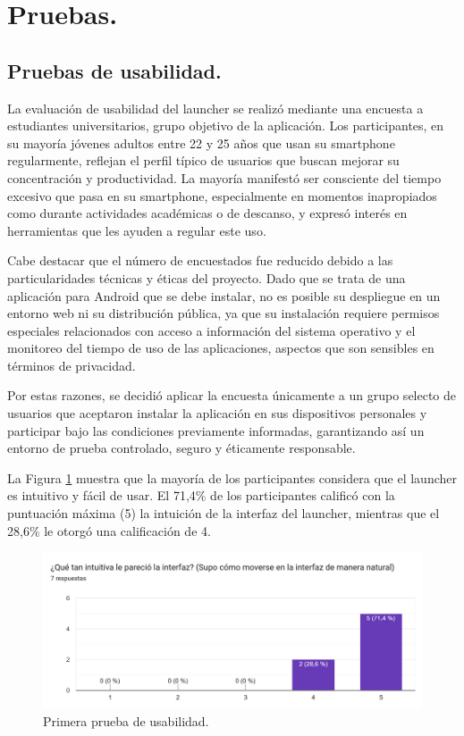 \section{Pruebas.}
\subsection{Pruebas de usabilidad.}

La evaluación de usabilidad del launcher se realizó mediante una encuesta a estudiantes universitarios, grupo objetivo de la aplicación. Los participantes, en su mayoría jóvenes adultos entre 22 y 25 años que usan su smartphone regularmente, reflejan el perfil típico de usuarios que buscan mejorar su concentración y productividad. La mayoría manifestó ser consciente del tiempo excesivo que pasa en su smartphone, especialmente en momentos inapropiados como durante actividades académicas o de descanso, y expresó interés en herramientas que les ayuden a regular este uso.

Cabe destacar que el número de encuestados fue reducido debido a las particularidades técnicas y éticas del proyecto. Dado que se trata de una aplicación para Android que se debe instalar, no es posible su despliegue en un entorno web ni su distribución pública, ya que su instalación requiere permisos especiales relacionados con acceso a información del sistema operativo y el monitoreo del tiempo de uso de las aplicaciones, aspectos que son sensibles en términos de privacidad.

Por estas razones, se decidió aplicar la encuesta únicamente a un grupo selecto de usuarios que aceptaron instalar la aplicación en sus dispositivos personales y participar bajo las condiciones previamente informadas, garantizando así un entorno de prueba controlado, seguro y éticamente responsable.

La Figura \ref{fig:interfaz_intuitiva} muestra que la mayoría de los participantes considera que el launcher es intuitivo y fácil de usar. El 71,4\% de los participantes calificó con la puntuación máxima (5) la intuición de la interfaz del launcher, mientras que el 28,6\% le otorgó una calificación de 4.

\begin{figure}[h]
  \caption{Primera prueba de usabilidad.}
  \label{fig:interfaz_intuitiva}
  \includegraphics[width=\textwidth]{Figuras/interfaz_intuitiva.png}
  \centering
\end{figure}

